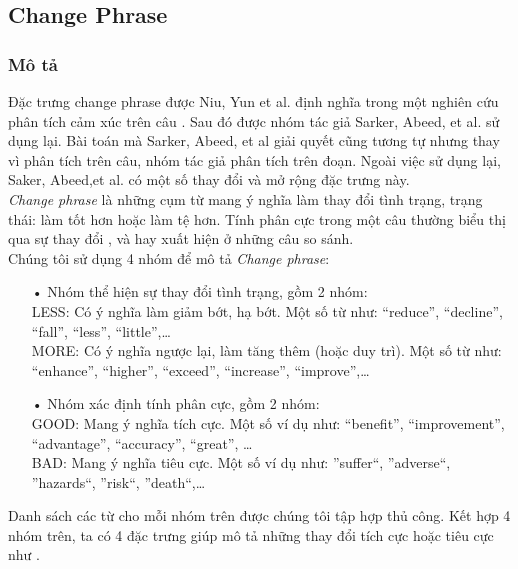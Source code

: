 \subsection{Change Phrase}
\subsubsection*{Mô tả}
Đặc trưng change phrase được Niu, Yun et al. định nghĩa trong một nghiên cứu phân tích cảm xúc trên câu \cite{niu2005analysis}. Sau đó được nhóm tác giả Sarker, Abeed, et al. sử dụng lại. Bài toán mà Sarker, Abeed, et al giải quyết cũng tương tự nhưng thay vì phân tích trên câu, nhóm tác giả phân tích trên đoạn. Ngoài việc sử dụng lại, Saker, Abeed,et al. có một số thay đổi và mở rộng đặc trưng này.\\

\textit{Change phrase} là những cụm từ mang ý nghĩa làm thay đổi tình trạng, trạng thái: làm tốt hơn hoặc làm tệ hơn. Tính phân cực trong một câu thường biểu thị qua sự thay đổi \cite{niu2005analysis}, và hay xuất hiện ở những câu so sánh. \\

Chúng tôi sử dụng 4 nhóm để mô tả \textit{Change phrase}:
\begin{itemize}
\item[•]Nhóm thể hiện sự thay đổi tình trạng, gồm 2 nhóm:\\
LESS: Có ý nghĩa làm giảm bớt, hạ bớt. Một số từ như: ``reduce'', ``decline'', ``fall'', ``less'', ``little'',\ldots \\
MORE: Có ý nghĩa ngược lại, làm tăng thêm (hoặc duy trì). Một số từ như: ``enhance'', ``higher'', ``exceed'', ``increase'', ``improve'',\ldots
\item[•]Nhóm xác định tính phân cực, gồm 2 nhóm:\\
GOOD: Mang ý nghĩa tích cực. Một số ví dụ như: ``benefit'', ``improvement'', ``advantage'', ``accuracy'', ``great'', \ldots\\
BAD: Mang ý nghĩa tiêu cực. Một số ví dụ như: ''suffer``, ''adverse``, ''hazards``, ''risk``, ''death``,\ldots
\end{itemize}
Danh sách các từ cho mỗi nhóm trên được chúng tôi tập hợp thủ công. Kết hợp 4 nhóm trên, ta có 4 đặc trưng giúp mô tả những thay đổi tích cực hoặc tiêu cực như . \\


